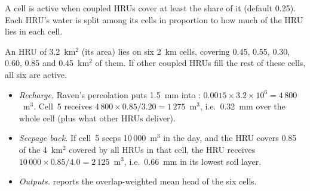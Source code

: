 A cell is active when coupled HRUs cover at least the share  of it (default 0.25). Each HRU's water
is split among its cells in proportion to how much of the HRU lies in each cell.
\begin{example}
An HRU of 3.2~km$^2$ (its  area) lies on six 2~km cells, covering 0.45, 0.55, 0.30, 0.60, 0.85 and 0.45~km$^2$ of
them. If other coupled HRUs fill the rest of these cells, all six are active.
\begin{itemize}
\item \emph{Recharge.} Raven's percolation puts 1.5~mm into : $0.0015\times3.2\times10^6=4\,800$~m$^3$.
Cell~5 receives $4\,800\times0.85/3.20=1\,275$~m$^3$, i.e.\ 0.32~mm over the whole cell (plus what other HRUs deliver).
\item \emph{Seepage back.} If cell~5 seeps 10\,000~m$^3$ in the day, and the HRU covers 0.85 of the 4~km$^2$ covered by all
HRUs in that cell, the HRU receives $10\,000\times0.85/4.0=2\,125$~m$^3$, i.e.\ 0.66~mm in its lowest soil layer.
\item \emph{Outputs.}  reports the overlap-weighted mean head of the six cells.
\end{itemize}
\end{example}

